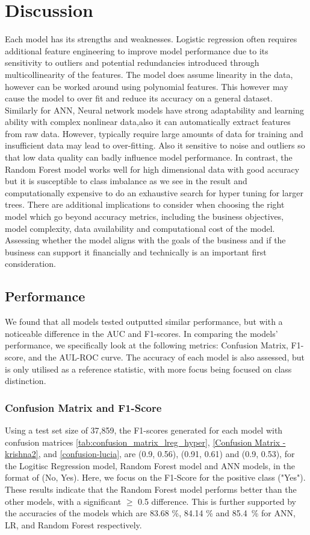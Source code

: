 \documentclass[10pt]{article}
\begin{document}
\pagebreak
\section{Discussion}
Each model has its strengths and weaknesses. Logistic regression often requires additional feature engineering to improve model performance due to its sensitivity to outliers and potential redundancies introduced through multicollinearity of the features. The model does assume linearity in the data, however can be worked around using polynomial features. This however may cause the model to over fit and reduce its accuracy on a general dataset. Similarly for ANN, Neural network models have strong adaptability and learning ability with complex nonlinear data,also it can automatically extract features from raw data. However, typically require large amounts of data for training and insufficient data may lead to over-fitting. Also it sensitive to noise and outliers so that low data quality can badly influence model performance.
In contrast, the Random Forest model works well for high dimensional data with good accuracy but it is susceptible to class imbalance as we see in the result and computationally expensive to do an exhaustive search for hyper tuning for larger trees. There are additional implications to consider when choosing the right model which go beyond accuracy metrics, including the business objectives, model complexity, data availability and computational cost of the model. Assessing whether the model aligns with the goals of the business and if the business can support it financially and technically is an important first consideration.

\subsection{Performance}
We found that all models tested outputted similar performance, but with a noticeable difference in the AUC and F1-scores. In comparing the models' performance, we specifically look at the following metrics: Confusion Matrix, F1-score, and the AUL-ROC curve. The accuracy of each model is also assessed, but is only utilised as a reference statistic, with more focus being focused on class distinction.

\subsubsection{Confusion Matrix and F1-Score}
Using a test set size of 37,859,  the F1-scores generated for each model with confusion matrices \ref{tab:confusion_matrix_lreg_hyper}, \ref{Confusion Matrix - krishna2}, and \ref{confusion-lucia}, are (0.9, 0.56),  (0.91, 0.61) and (0.9, 0.53), for the Logitisc Regression model, Random Forest model and ANN models, in the format of (No, Yes). Here, we focus on the F1-Score for the positive class ("Yes"). These results indicate that the Random Forest model performs better than the other models, with a significant \(\geq\) 0.5 difference. This is further supported by the accuracies of the models which are 83.68 \%, 84.14 \% and 85.4\ \% for ANN, LR, and Random Forest respectively.
\end{document}
